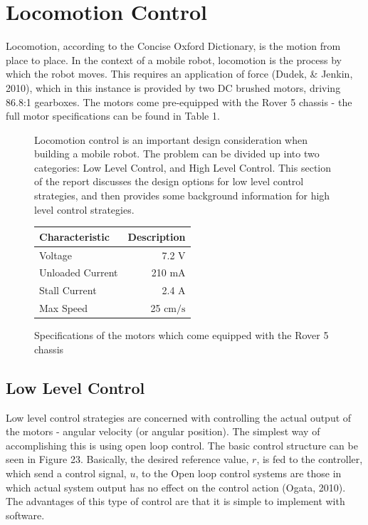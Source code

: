 \documentclass[a4paper]{article}
\begin{document}
\newpage

\section{Locomotion Control}
Locomotion, according to the Concise Oxford Dictionary, is the motion from place to place. In the context of a mobile robot, locomotion is the process by which the robot moves. This requires an application of force (Dudek, \& Jenkin, 2010), which in this instance is provided by two DC brushed motors, driving 86.8:1 gearboxes. The motors come pre-equipped with the Rover 5 chassis - the full motor specifications can be found in Table 1. 

\begin{figure}[h]
\begin{minipage}{0.45\textwidth}
Locomotion control is an important design consideration when building a mobile robot. The problem can be divided up into two categories: Low Level Control, and High Level Control. This section of the report discusses the design options for low level control strategies, and then provides some background information for high level control strategies.
\vspace{0.4cm}
\end{minipage}
\hspace{1cm}
\begin{minipage}{0.45\textwidth}
\centering
\caption{Specifications of the motors which come equipped with the Rover 5 chassis}
\footnotesize\begin{tabular}{lr}
\toprule
\textbf{Characteristic} & \textbf{Description}\\
\midrule
Voltage & 7.2 $\si{\volt}$\\
Unloaded Current & 210 $\si{\milli\ampere}$\\
Stall Current & 2.4 $\si{\ampere}$\\
Max Speed & 25 $\si{\centi\meter\per\second}$\\
\bottomrule
\end{tabular}
\end{minipage}
\end{figure}

\subsection{Low Level Control}
Low level control strategies are concerned with controlling the actual output of the motors - angular velocity (or angular position). The simplest way of accomplishing this is using open loop control. The basic control structure can be seen in Figure 23. Basically, the desired reference value, $r$, is fed to the controller, which send a control signal, $u$, to the   Open loop control systems are those in which actual system output has no effect on the control action (Ogata, 2010). The advantages of this type of control are that it is simple to implement with software.  
\end{document}
